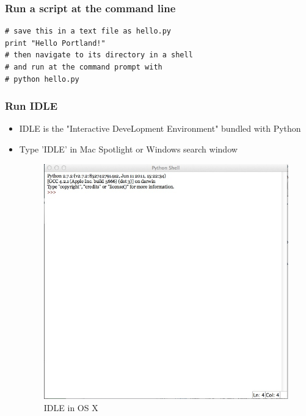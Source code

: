 \documentclass{beamer}
\begin{document}
\begin{frame}[fragile]
\frametitle{Run a script at the command line}
\begin{lstlisting}
# save this in a text file as hello.py
print "Hello Portland!"
# then navigate to its directory in a shell
# and run at the command prompt with 
# python hello.py
\end{lstlisting}
\end{frame}

\begin{frame}[fragile]
\frametitle{Run IDLE}
\begin{itemize}
  \item IDLE is the "Interactive DeveLopment Environment" bundled with Python
  \item Type 'IDLE' in Mac Spotlight or Windows search window
  \begin{figure}
 \includegraphics[scale=0.25]{idle.jpg} 
 \caption{IDLE in OS X}
\end{figure}
\end{itemize} 
\end{frame}
\end{document}
